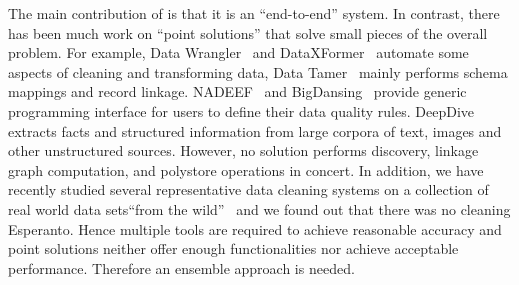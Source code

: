 \smallskip
The main contribution of \dcv is that it is an ``end-to-end'' system. In contrast, there has been much work on ``point solutions'' that solve small pieces of the overall problem. For example, Data Wrangler~\cite{2011-wrangler} and DataXFormer~\cite{DBLP:conf/icde/AbedjanMIOPS16} automate some aspects of cleaning and transforming data, Data
Tamer~\cite{DBLP:conf/cidr/StonebrakerBIBCZPX13} mainly performs schema mappings and record linkage. 
NADEEF~\cite{DBLP:conf/sigmod/DallachiesaEEEIOT13} and BigDansing~\cite{bigdansing} provide generic programming interface for users to define their data quality rules. DeepDive~\cite{DBLP:journals/pvldb/ShinWWSZR15} extracts
facts and structured information from large corpora of text, images and other
unstructured sources. However, no solution performs  discovery, linkage graph
computation, and polystore operations in concert. 
In addition, we have recently
studied several representative data cleaning systems on a collection of real
world data sets``from the wild''~\cite{DBLP:journals/pvldb/AbedjanCDFIOPST16}
and we found out that there was no cleaning Esperanto. 
Hence multiple tools are
required to achieve reasonable accuracy and point solutions neither offer enough functionalities nor achieve acceptable performance. Therefore an ensemble approach is needed.

